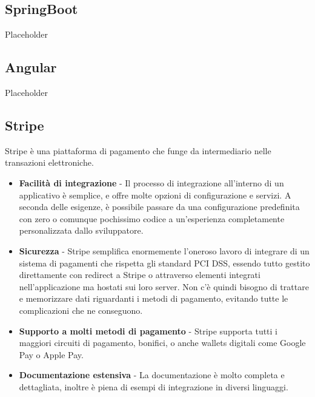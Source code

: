 \subsection {SpringBoot}
Placeholder
\subsection{Angular}
Placeholder
\subsection{Stripe}
Stripe \`e una piattaforma di pagamento che funge da intermediario nelle transazioni elettroniche.

\begin{itemize}
  \item \textbf{Facilit\`a di integrazione} - Il processo di integrazione all'interno di un applicativo \`e semplice, e offre molte opzioni di configurazione e servizi.
    A seconda delle esigenze, \`e possibile passare da una configurazione predefinita con zero o comunque pochissimo codice a un'esperienza completamente personalizzata dallo sviluppatore.
  \item \textbf{Sicurezza} - Stripe semplifica enormemente l'oneroso lavoro di integrare di un sistema di pagamenti che rispetta
    gli standard PCI DSS, essendo tutto gestito direttamente con redirect a Stripe o attraverso elementi integrati nell'applicazione ma hostati sui loro server. Non c'\`e quindi
    bisogno di trattare e memorizzare dati riguardanti i metodi di pagamento, evitando tutte le complicazioni che ne conseguono.
  \item \textbf{Supporto a molti metodi di pagamento} - Stripe supporta tutti i maggiori circuiti di pagamento, bonifici, o anche wallets digitali come Google Pay o Apple Pay.
  \item \textbf{Documentazione estensiva} - La documentazione \`e molto completa e dettagliata, inoltre \`e piena di esempi di integrazione in diversi linguaggi.
\end{itemize}
